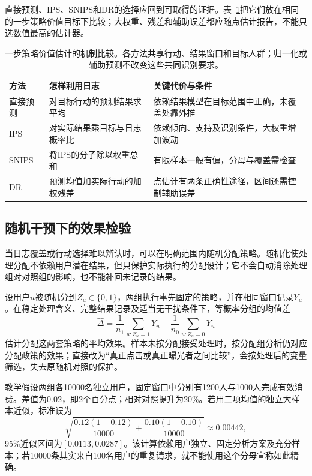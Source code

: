 直接预测、IPS、SNIPS和DR的选择应回到可取得的证据。表~\ref{tab:rs-evaluation-estimators}把它们放在相同的一步策略价值目标下比较；大权重、残差和辅助误差都应随点估计报告，不能只选数值最高的估计器。

\begin{table}[htbp]
 \centering
 \small
 \begin{tabularx}{\linewidth}{@{}lXX@{}}
  \toprule
  方法 & 怎样利用日志 & 关键代价与条件\\
  \midrule
  直接预测 & 对目标行动的预测结果求平均 & 依赖结果模型在目标范围中正确，未覆盖处靠外推\\
  IPS & 对实际结果乘目标与日志概率比 & 依赖倾向、支持及识别条件，大权重增加波动\\
  SNIPS & 将IPS的分子除以权重总和 & 有限样本一般有偏，分母与覆盖需检查\\
  DR & 预测均值加实际行动的加权残差 & 点估计有两条正确性途径，区间还需控制辅助误差\\
  \bottomrule
 \end{tabularx}
 \caption{一步策略价值估计的机制比较。各方法共享行动、结果窗口和目标人群；归一化或辅助预测不改变这些共同识别要求。}
 \label{tab:rs-evaluation-estimators}
\end{table}

\subsection{随机干预下的效果检验}
\label{sec:rs-evaluation-randomized}

当日志覆盖或行动选择难以辨认时，可以在明确范围内随机分配策略。随机化使处理分配不依赖用户潜在结果，但只保护实际执行的分配设计；它不会自动消除处理组对对照组的影响，也不能补回未记录的结果。

设用户$u$被随机分到$Z_u\in\{0,1\}$，两组执行事先固定的策略，并在相同窗口记录$Y_u$。在稳定处理含义、完整结果记录及适当无干扰条件下，等概率分组的均值差
\begin{equation}
  \widehat\Delta
    =\frac1{n_1}\sum_{u:Z_u=1}Y_u
      -\frac1{n_0}\sum_{u:Z_u=0}Y_u
  \label{eq:rs-evaluation-experiment}
\end{equation}
估计分配这两套策略的平均效果。样本未按分配接受处理时，按分配组分析仍对应分配政策的效果；直接改为“真正点击或真正曝光者之间比较”，会按处理后的变量筛选，失去原随机对照的保护。

教学假设两组各10000名独立用户，固定窗口中分别有1200人与1000人完成有效消费。差值为0.02，即2个百分点；相对对照提升为20\%。若用二项均值的独立大样本近似，标准误为
\[
  \sqrt{\frac{0.12(1-0.12)}{10000}
             +\frac{0.10(1-0.10)}{10000}}
    \approx0.00442,
\]
95\%近似区间为$[0.0113,0.0287]$。该计算依赖用户独立、固定分析方案及充分样本；若10000条其实来自100名用户的重复请求，就不能使用这个分母宣称如此精确。

